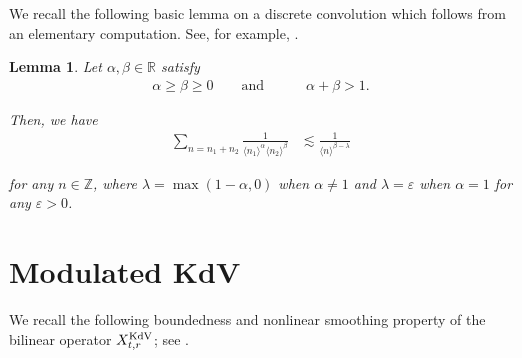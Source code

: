 \documentclass[letterpaper, 11pt,  reqno]{amsart}
\newtheorem{lemma}[theorem]{Lemma}
\newcommand{\1}{\hspace{0.5mm}\text{I}\hspace{0.5mm}}
\newcommand{\noi}{\noindent}
\newcommand{\Z}{\mathbb{Z}}
\newcommand{\R}{\mathbb{R}}
\newcommand{\al}{\alpha}
\newcommand{\be}{\beta}
\newcommand{\eps}{\varepsilon}
\newcommand{\ld}{\lambda}
\newcommand{\les}{\lesssim}
\newcommand{\jb}[1]
{\langle #1 \rangle}
\newcommand{\KDV}{\text{\rm KdV} }
\numberwithin{equation}{section}
\numberwithin{theorem}{section}
\begin{document}
\medskip







We recall the following basic lemma on a  discrete convolution
which follows
from an elementary  computation.
See, for example,  
 \cite[Lemma 4.2]{GTV}. %





\begin{lemma}\label{LEM:SUM}
Let  $\al, \be \in \R$ satisfy
\begin{align*}
 \al \ge \be \ge 0 \qquad \text{and}\qquad  \quad \al+ \be > 1.
\end{align*}


\noi
Then, we have
\begin{align*}
 \sum_{n = n_1 + n_2} \frac{1}{\jb{n_1}^\al \jb{n_2}^\be}
& \les \frac 1{\jb{n}^{ \be - \ld}}
\end{align*}

\noi
for any  $n \in \Z$, 
where $\ld = 
\max( 1- \al, 0)$ when $\al\ne 1$ and $\ld = \eps$ when $\al = 1$ for any $\eps > 0$.


\end{lemma}










\section{Modulated KdV}
\label{SEC:KDV}

We recall the following boundedness 
and nonlinear smoothing property 
of the bilinear operator $X^\KDV_{t, r}$;
see \cite[Proposition 4.1]{CGLLO1}.
\end{document}
